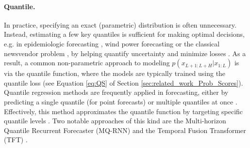\documentclass[a4paper,oneside,bibliography=totoc]{scrbook}
\begin{document}
\paragraph{Quantile.}
In practice, specifying an exact (parametric) distribution is often unnecessary. Instead, estimating a few key quantiles is sufficient for making optimal decisions, e.g. in epidemiologic forecasting \cite{bracher_evaluating_2021, ray_ensemble_2020}, wind power forecasting \cite{wan_direct_2017} or the classical newsvendor problem \cite{gneiting_model_2023, tarima_use_2020, harsha_prescriptive_2021}, by helping quantify uncertainty and minimize losses \cite{bracher_evaluating_2021, wen_multi-horizon_2018, gneiting_model_2023}. 
As a result, a common non-parametric approach to modeling $p(x_{L+1:L+H} | x_{1:L})$ is via the quantile function, where the models are typically trained using the quantile loss (see Equation \ref{eq:QS} of Section \ref{sec:related_work_Prob_Scores}). 
Quantile regression methods \cite{koenker_regression_1978, koenker_quantile_2005} are frequently applied in forecasting, either by predicting a single quantile (for point forecasts) or multiple quantiles at once \cite{wen_multi-horizon_2018}. 
Effectively, this method approximates the quantile function by targeting specific quantile levels \cite{benidis_deep_2022}.
Two notable approaches of this kind are the Multi-horizon Quantile Recurrent Forecaster (MQ-RNN) \cite{wen_multi-horizon_2018} and the Temporal Fusion Transformer (TFT) \cite{lim_temporal_2021}. 
\end{document}
